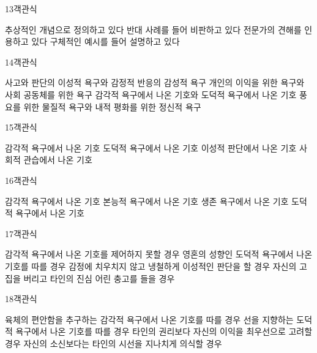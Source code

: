 \documentclass[fs9,seriesRus]{korfarm-base}
\begin{document}
\begin{kfQBlock}{13}{객관식}
\begin{kfChoices}
\kfChoice 추상적인 개념으로 정의하고 있다
\kfChoice 반대 사례를 들어 비판하고 있다
\kfChoice 전문가의 견해를 인용하고 있다
\kfChoice 구체적인 예시를 들어 설명하고 있다
\end{kfChoices}
\end{kfQBlock}
\begin{kfQBlock}{14}{객관식}
\begin{kfChoices}
\kfChoice 사고와 판단의 이성적 욕구와 감정적 반응의 감성적 욕구
\kfChoice 개인의 이익을 위한 욕구와 사회 공동체를 위한 욕구
\kfChoice 감각적 욕구에서 나온 기호와 도덕적 욕구에서 나온 기호
\kfChoice 풍요를 위한 물질적 욕구와 내적 평화를 위한 정신적 욕구
\end{kfChoices}
\end{kfQBlock}
\begin{kfQBlock}{15}{객관식}
\begin{kfChoices}
\kfChoice 감각적 욕구에서 나온 기호
\kfChoice 도덕적 욕구에서 나온 기호
\kfChoice 이성적 판단에서 나온 기호
\kfChoice 사회적 관습에서 나온 기호
\end{kfChoices}
\end{kfQBlock}
\begin{kfQBlock}{16}{객관식}
\begin{kfChoices}
\kfChoice 감각적 욕구에서 나온 기호
\kfChoice 본능적 욕구에서 나온 기호
\kfChoice 생존 욕구에서 나온 기호
\kfChoice 도덕적 욕구에서 나온 기호
\end{kfChoices}
\end{kfQBlock}
\begin{kfQBlock}{17}{객관식}
\begin{kfChoices}
\kfChoice 감각적 욕구에서 나온 기호를 제어하지 못할 경우
\kfChoice 영혼의 성향인 도덕적 욕구에서 나온 기호를 따를 경우
\kfChoice 감정에 치우치지 않고 냉철하게 이성적인 판단을 할 경우
\kfChoice 자신의 고집을 버리고 타인의 진심 어린 충고를 들을 경우
\end{kfChoices}
\end{kfQBlock}
\begin{kfQBlock}{18}{객관식}
\begin{kfChoices}
\kfChoice 육체의 편안함을 추구하는 감각적 욕구에서 나온 기호를 따를 경우
\kfChoice 선을 지향하는 도덕적 욕구에서 나온 기호를 따를 경우
\kfChoice 타인의 권리보다 자신의 이익을 최우선으로 고려할 경우
\kfChoice 자신의 소신보다는 타인의 시선을 지나치게 의식할 경우
\end{kfChoices}
\end{kfQBlock}
\end{document}
